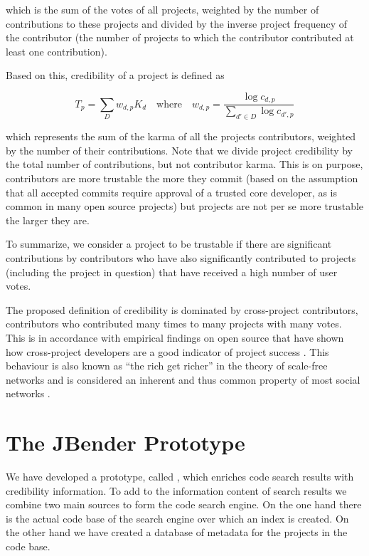 \documentclass[10pt]{book}
\begin{document}
\noindent
which is the sum of the votes of all projects, weighted by the number of contributions to these projects and divided by the inverse project frequency of the contributor (\ie the number of projects to which the contributor contributed at least one contribution).


Based on this, credibility of a project is defined as 

	$$T_{p} = \sum_{D} w_{d,p} K_d
	\quad \mathrm{where} \quad 
	w_{d,p} = \frac{\log c_{d,p}}{\sum_{d' \in D} \log c_{d',p}}$$

\noindent
which represents the sum of the karma of all the projects contributors, weighted by the number of their contributions.
Note that we divide project credibility by the total number of contributions, but not contributor karma. This is on purpose, contributors are more trustable the more they commit (based on the assumption that all accepted commits require approval of a trusted core developer, as is common in many open source projects) but projects are not per se more trustable the larger they are.

To summarize, we consider a project to be trustable if there are significant contributions by contributors who have also significantly contributed to projects (including the project in question) that have received a high number of user votes.

The proposed definition of credibility is dominated by cross-project contributors, \ie contributors who contributed many times to many projects with many votes. This is in accordance with empirical findings on open source that have shown how cross-project developers are a good indicator of project success \cite{Kats07a}. This behaviour is also known as ``the rich get richer'' in the theory of scale-free networks and is considered an inherent and thus common property of most social networks \cite{Bara03a}.

\section{The JBender Prototype}
\label{sec:approach}

We have developed a prototype, called \Jbd, which enriches code search results with credibility information. To add to the information content of search results we combine two main sources to form the \Jbd code search engine. On the one hand there is the actual code base of the search engine over which an index is created. On the other hand we have created a database of metadata for the projects in the code base. 
\end{document}
